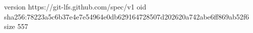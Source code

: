 version https://git-lfs.github.com/spec/v1
oid sha256:78223a5c6b37e4e7e54964e0db629164728507d202620a742abe6ff869ab52f6
size 557
